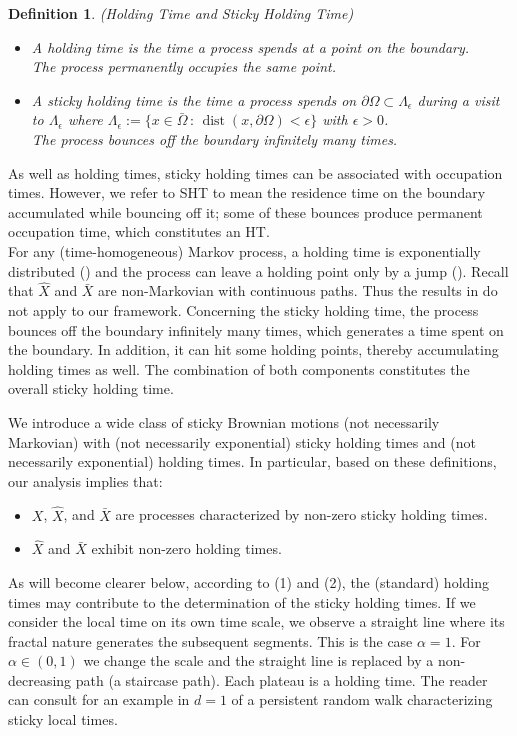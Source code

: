 \documentclass[11pt,a4paper]{article}
\newtheorem{definition}{Definition}
\newcommand{\magenta}{black}
\begin{document}
{\color{\magenta}
\begin{definition}
(Holding Time and Sticky Holding Time)
\begin{itemize}
\item[HT)] A holding time is the time a process spends at a point on the boundary.\\ The process permanently occupies the same point.
\item[SHT)] A sticky holding time is the time a process spends on $\partial \Omega \subset \Lambda_\epsilon$ during a visit to $\Lambda_\epsilon$ where $\Lambda_\epsilon := \{x \in \bar{\Omega}\,:\, \operatorname{dist}(x, \partial \Omega) < \epsilon\}$ with $\epsilon >0$.\\ The process bounces off the boundary infinitely many times.
\end{itemize} 
\label{defSHTandHT} 
\end{definition}

As well as holding times, sticky holding times can be associated with occupation times. However, we refer to SHT to mean the residence time on the boundary accumulated while bouncing off it; some of these bounces produce permanent occupation time, which constitutes an HT.\\

For any (time-homogeneous) Markov process, a holding time is exponentially distributed (\cite[Proposition 2.19]{BluGet68}) and the process can leave a holding point only by a jump (\cite[Proposition 3.13]{BluGet68}). Recall that $\hat{X}$ and $\bar{X}$ are non-Markovian with continuous paths. Thus the results in \cite{BluGet68} do not apply to our framework. Concerning the sticky holding time, the process bounces off the boundary infinitely many times, which generates a time spent on the boundary. In addition, it can hit some holding points, thereby accumulating holding times as well. The combination of both components constitutes the overall sticky holding time.

We introduce a wide class of sticky Brownian motions (not necessarily Markovian) with (not necessarily exponential) sticky holding times and (not necessarily exponential) holding times. In particular, based on these definitions, our analysis implies that:
\begin{itemize}
\item $X$, $\hat{X}$, and $\bar{X}$ are processes characterized by non-zero sticky holding times.
\item $\hat{X}$ and $\bar{X}$ exhibit non-zero holding times.
\end{itemize}
As will become clearer below, according to (1) and (2), the (standard) holding times may contribute to the determination of the sticky holding times. If we consider the local time on its own time scale, we observe a straight line where its fractal nature generates the subsequent segments. This is the case $\alpha=1$. For $\alpha \in (0,1)$ we change the scale and the straight line is replaced by a non-decreasing path (a staircase path). Each plateau is a holding time. The reader can consult \cite[formulas (4.11) and (4.12)]{OnTelegSign} for an example in $d=1$ of a persistent random walk characterizing sticky local times.
}
\end{document}
